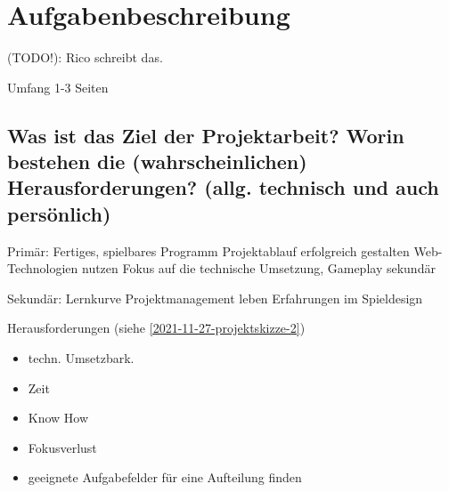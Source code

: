 

\section{Aufgabenbeschreibung}

(TODO!): Rico schreibt das.

Umfang 1-3 Seiten


\subsection{Was ist das Ziel der Projektarbeit? Worin bestehen die (wahrscheinlichen) Herausforderungen? (allg. technisch und auch persönlich)}

Primär: 
Fertiges, spielbares Programm 
Projektablauf erfolgreich gestalten 
Web-Technologien nutzen
Fokus auf die technische Umsetzung, Gameplay sekundär

Sekundär: 
Lernkurve
Projektmanagement leben
Erfahrungen im Spieldesign 

Herausforderungen (siehe \ref{2021-11-27-projektskizze-2})

\begin{itemize}
    \item techn. Umsetzbark.
    \item Zeit
    \item Know How
    \item Fokusverlust
    \item geeignete Aufgabefelder für eine Aufteilung finden 
\end{itemize}




